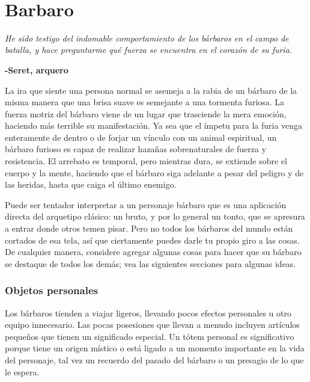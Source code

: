 \documentclass[a4paper,twocolumn,openany,10pt]{dndbook}
\begin{document}
\newpage

$ $

\newpage
\section{Barbaro}

\begin{quotebox}
\textit{He sido testigo del indomable comportamiento de los bárbaros en el campo de batalla, y hace preguntarme qué fuerza se encuentra en
el corazón de su furia.}

\begin{flushright}
\textbf{-Seret, arquero}
\end{flushright}

\end{quotebox}

La ira que siente una persona normal se asemeja a la rabia de un bárbaro de la misma manera que una brisa suave es semejante a una tormenta
furiosa. La fuerza motriz del bárbaro viene de un lugar que trasciende la mera emoción, haciendo más terrible su manifestación. Ya sea que
el ímpetu para la furia venga enteramente de dentro o de forjar un vínculo con un animal espiritual, un bárbaro furioso es capaz de realizar
hazañas sobrenaturales de fuerza y resistencia. El arrebato es temporal, pero mientras dura, se extiende sobre el cuerpo y la mente, haciendo
que el bárbaro siga adelante a pesar del peligro y de las heridas, hasta que caiga el último enemigo.

Puede ser tentador interpretar a un personaje bárbaro que es una aplicación directa del arquetipo clásico: un bruto, y por lo general un
tonto, que se apresura a entrar donde otros temen pisar. Pero no todos los bárbaros del mundo están cortados de esa tela, así que ciertamente
puedes darle tu propio giro a las cosas. De cualquier manera, considere agregar algunas cosas para hacer que su bárbaro se destaque de todos
los demás; vea las siguientes secciones para algunas ideas. 

\subsubsection*{Objetos personales}

Los bárbaros tienden a viajar ligeros, llevando pocos efectos personales u otro equipo innecesario. Las pocas posesiones que llevan a menudo
incluyen artículos pequeños que tienen un significado especial. Un tótem personal es significativo porque tiene un origen místico o está
ligado a un momento importante en la vida del personaje, tal vez un recuerdo del pasado del bárbaro o un presagio de lo que le espera.
\end{document}
